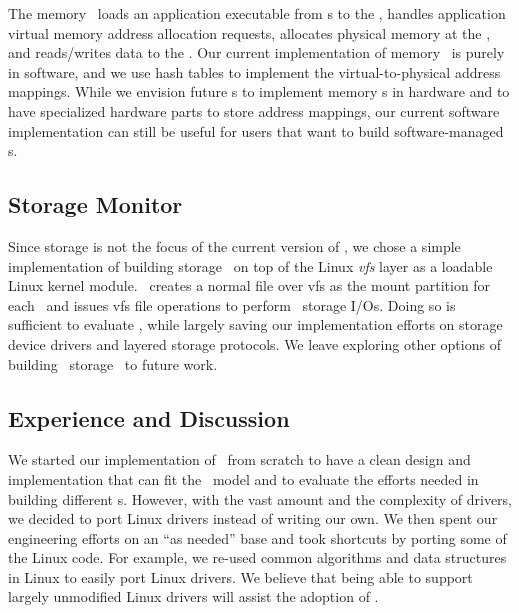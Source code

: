 The memory \microos\ loads an application executable from \scomponent{}s 
to the \mcomponent, handles application virtual memory address allocation requests,
allocates physical memory at the \mcomponent,
and reads/writes data to the \mcomponent.
Our current implementation of memory \microos\ is purely in software,
and we use hash tables to implement the virtual-to-physical address mappings.
While we envision future \mcomponent{}s to implement memory \microos{}s in hardware and
to have specialized hardware parts to store address mappings,
our current software implementation can still be useful for 
users that want to build software-managed \mcomponent{}s.

\subsection{Storage Monitor}
Since storage is not the focus of the current version of \lego,
we chose a simple implementation of building storage \microos\ on top of the Linux {\em vfs} layer as a loadable Linux kernel module.
\lego\ creates a normal file over vfs as the mount partition for each \vnode\
and issues vfs file operations to perform \lego\ storage I/Os.
Doing so is sufficient to evaluate \lego, while largely saving our implementation efforts on storage device drivers and layered storage protocols.
We leave exploring other options of building \lego\ storage \microos\ to future work.

\subsection{Experience and Discussion}
We started our implementation of \lego\ from scratch to have a clean design and implementation that 
can fit the \splitkernel\ model
and to evaluate the efforts needed in building different \microos{}s.
However, with the vast amount and the complexity of drivers, we decided to port Linux drivers
instead of writing our own.
We then spent our engineering efforts on an ``as needed'' base
and took shortcuts by porting some of the Linux code. 
For example, we re-used common algorithms and data structures in Linux to easily port Linux drivers.
We believe that being able to support largely unmodified Linux drivers
will assist the adoption of \lego.

